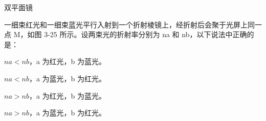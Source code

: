 \documentclass[standard, analysis, notocnum]{ExBook}
\newcommand{\answerarea}[1][8cm]{%
  \par\vspace{2mm}%
  \noindent{\color{themeColor!35}\rule{\linewidth}{0.4pt}}\par
  \noindent\begin{minipage}[t][#1][t]{\linewidth}\vspace{0pt}\end{minipage}\par
  \noindent{\color{themeColor!35}\rule{\linewidth}{0.4pt}}\par
}
\begin{document}
\begin{qitems}
\begin{bbox}
\par\noindent\hspace{2em}双平面镜
\answerarea[3.5cm]
\end{bbox}
\begin{bbox}
\qitem 一细束红光和一细束蓝光平行入射到一个折射棱镜上，经折射后会聚于光屏上同一点 M，如图 3-25 所示。设两束光的折射率分别为 na 和 nb，以下说法中正确的是：
\par\noindent\hspace{2em}$na<nb$，a 为红光，b 为蓝光。
\par\noindent\hspace{2em}$na<nb$，a 为蓝光，b 为红光。
\par\noindent\hspace{2em}$na>nb$，a 为红光，b 为蓝光。
\par\noindent\hspace{2em}$na>nb$，a 为蓝光，b 为红光。
\answerarea[3.5cm]
\end{bbox}
\end{qitems}
\end{document}
